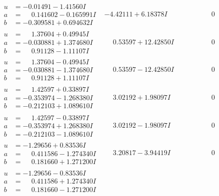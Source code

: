 \documentclass[1p]{elsarticle_modified}
\theoremstyle{definition}
\begin{document}
$$\begin{array}{c|c|c}
\begin{aligned}
u &= -0.01491 - 1.41560 I \\
a &= \phantom{-}0.141602 - 0.165991 I \\
b &= -0.309581 + 0.694632 I\end{aligned}
 & -4.42111 + 6.18378 I & \phantom{-0.000000 } 0 \\ \hline\begin{aligned}
u &= \phantom{-}1.37604 + 0.49945 I \\
a &= -0.030881 + 1.374680 I \\
b &= \phantom{-}0.91128 - 1.11107 I\end{aligned}
 & \phantom{-}0.53597 + 12.42850 I & \phantom{-0.000000 } 0 \\ \hline\begin{aligned}
u &= \phantom{-}1.37604 - 0.49945 I \\
a &= -0.030881 - 1.374680 I \\
b &= \phantom{-}0.91128 + 1.11107 I\end{aligned}
 & \phantom{-}0.53597 - 12.42850 I & \phantom{-0.000000 } 0 \\ \hline\begin{aligned}
u &= \phantom{-}1.42597 + 0.33897 I \\
a &= -0.353974 - 1.268380 I \\
b &= -0.212103 + 1.089610 I\end{aligned}
 & \phantom{-}3.02192 + 1.98097 I & \phantom{-0.000000 } 0 \\ \hline\begin{aligned}
u &= \phantom{-}1.42597 - 0.33897 I \\
a &= -0.353974 + 1.268380 I \\
b &= -0.212103 - 1.089610 I\end{aligned}
 & \phantom{-}3.02192 - 1.98097 I & \phantom{-0.000000 } 0 \\ \hline\begin{aligned}
u &= -1.29656 + 0.83536 I \\
a &= \phantom{-}0.411586 - 1.274340 I \\
b &= \phantom{-}0.181660 + 1.271200 I\end{aligned}
 & \phantom{-}3.20817 - 3.94419 I & \phantom{-0.000000 } 0 \\ \hline\begin{aligned}
u &= -1.29656 - 0.83536 I \\
a &= \phantom{-}0.411586 + 1.274340 I \\
b &= \phantom{-}0.181660 - 1.271200 I\end{aligned}

\end{array}$$
\end{document}
